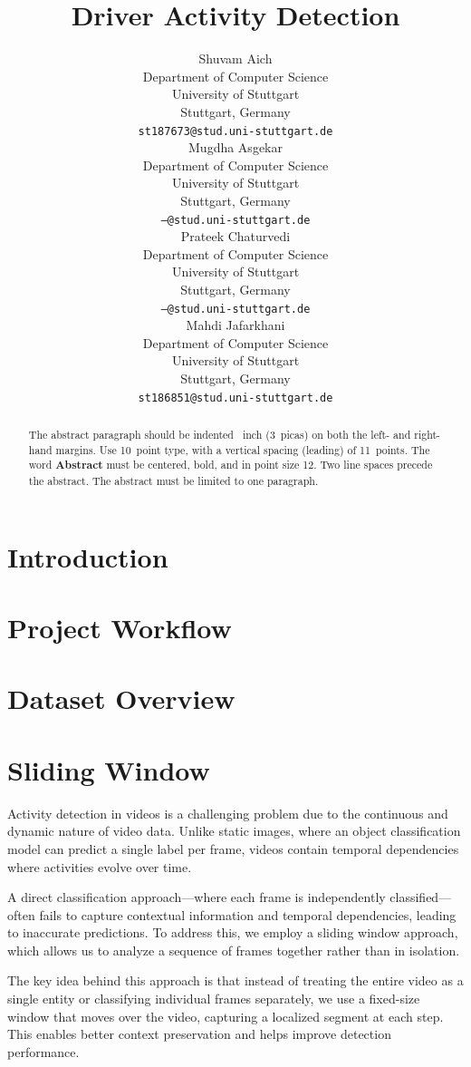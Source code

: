 \documentclass{article}
\title{Driver Activity Detection}
\author{%
  Shuvam Aich \\
  Department of Computer Science\\
  University of Stuttgart\\
  Stuttgart, Germany \\
  \texttt{st187673@stud.uni-stuttgart.de} \\
  \And
  Mugdha Asgekar \\
  Department of Computer Science\\
  University of Stuttgart\\
  Stuttgart, Germany \\
  \texttt{---@stud.uni-stuttgart.de} \\
  \AND
  Prateek Chaturvedi \\
  Department of Computer Science\\
  University of Stuttgart\\
  Stuttgart, Germany \\
  \texttt{---@stud.uni-stuttgart.de} \\
  \And
  Mahdi Jafarkhani \\
  Department of Computer Science\\
  University of Stuttgart\\
  Stuttgart, Germany \\
  \texttt{st186851@stud.uni-stuttgart.de} \\
}
\begin{document}
\maketitle


\begin{abstract}
  The abstract paragraph should be indented ~inch (3~picas) on
  both the left- and right-hand margins. Use 10~point type, with a vertical
  spacing (leading) of 11~points.  The word \textbf{Abstract} must be centered,
  bold, and in point size 12. Two line spaces precede the abstract. The abstract
  must be limited to one paragraph.
\end{abstract}


\section{Introduction}

\section{Project Workflow}

\section{Dataset Overview}

\section{Sliding Window}
Activity detection in videos is a challenging problem due to the continuous and dynamic nature of video data. Unlike static images, where an object classification model can predict a single label per frame, videos contain temporal dependencies where activities evolve over time.

A direct classification approach—where each frame is independently classified—often fails to capture contextual information and temporal dependencies, leading to inaccurate predictions. To address this, we employ a sliding window approach, which allows us to analyze a sequence of frames together rather than in isolation.

The key idea behind this approach is that instead of treating the entire video as a single entity or classifying individual frames separately, we use a fixed-size window that moves over the video, capturing a localized segment at each step. This enables better context preservation and helps improve detection performance.
\end{document}
